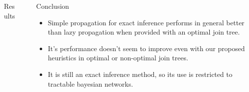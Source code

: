 \documentclass[final]{beamer}
\newlength{\sepwid}
\newlength{\onecolwid}
\newlength{\twocolwid}
\begin{document}
\begin{frame}[t]
\begin{columns}[t]
\begin{column}{\twocolwid}
\begin{columns}[t,totalwidth=\twocolwid]
\begin{column}{\onecolwid}
\begin{block}{Results}
\end{block}


\end{column} %

\end{columns} %





\begin{columns}[t,totalwidth=\twocolwid] %


\end{columns} %

\end{column} %

\begin{column}{\sepwid}\end{column} %

\begin{column}{\onecolwid} %


\begin{block}{Conclusion}

\begin{itemize}
\item Simple propagation for exact inference performs in general better than lazy propagation when provided with an optimal join tree.
\item It's performance doesn't seem to improve even with our proposed heuristics in optimal or non-optimal join trees. 
\item It is still an exact inference method, so its use is restricted to tractable bayesian networks.
\end{itemize}
 


\end{block}
\end{column}
\end{columns}
\end{frame}
\end{document}
